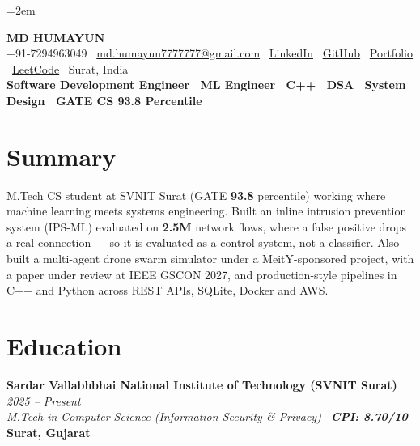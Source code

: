 \documentclass[10pt, legalpaper]{article}
\newcommand{\eduentry}[4]{%
    \noindent\textbf{#1} \hfill \textit{\color{medgray}#2}\\[1pt]
    \noindent\textit{\color{darkgray}#3} \hfill \textbf{#4}\\[2pt]
}
\begin{document}
\raggedbottom
{}
\emergencystretch=2em
\pagestyle{empty}

\begin{center}
{\LARGE\bfseries MD HUMAYUN}\\[2pt]
{\small
+91-7294963049 \textbar\
\href{mailto:md.humayun7777777@gmail.com}{md.humayun7777777@gmail.com} \textbar\
\href{https://www.linkedin.com/in/md-humayun-82051521a/}{LinkedIn} \textbar\
\href{https://github.com/mdhumayun7}{GitHub} \textbar\
\href{https://mdhumayun7.github.io/MD-HUMAYUN-PORTFOLIO/}{Portfolio} \textbar\
\href{https://leetcode.com/u/mdhumayun7/}{LeetCode} \textbar\
Surat, India
}\\[3pt]
{\small\textbf{Software Development Engineer \textbar\ ML Engineer \textbar\ C++ \textbar\ DSA \textbar\ System Design \textbar\ GATE CS 93.8 Percentile}}
\end{center}

\vspace{-2pt}

\section{Summary}

{\small
M.Tech CS student at SVNIT Surat (GATE \textbf{93.8} percentile) working where machine learning meets systems engineering. Built an inline intrusion prevention system (IPS-ML) evaluated on \textbf{2.5M} network flows, where a false positive drops a real connection --- so it is evaluated as a control system, not a classifier. Also built a multi-agent drone swarm simulator under a MeitY-sponsored project, with a paper under review at IEEE GSCON 2027, and production-style pipelines in C++ and Python across REST APIs, SQLite, Docker and AWS.
}

\section{Education}

\eduentry
{Sardar Vallabhbhai National Institute of Technology (SVNIT Surat)}
{2025 -- Present}
{M.Tech in Computer Science (Information Security \& Privacy) \textbar\ \textbf{CPI: 8.70/10}}
{Surat, Gujarat}
\end{document}
